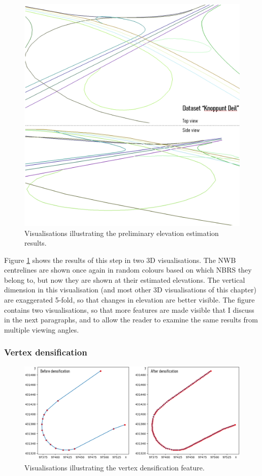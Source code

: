 \begin{figure}
    \centering
    \includegraphics[width=0.9\linewidth]{final_report/figs/elevationestimation0.png}
    \caption{Visualisations illustrating the preliminary elevation estimation results.}
    \label{fig:elevationestimation0}
\end{figure}

Figure \ref{fig:elevationestimation0} shows the results of this step in two 3D visualisations. The NWB centrelines are shown once again in random colours based on which NBRS they belong to, but now they are shown at their estimated elevations. The vertical dimension in this visualisation (and most other 3D visualisations of this chapter) are exaggerated 5-fold, so that changes in elevation are better visible. The figure contains two visualisations, so that more features are made visible that I discuss in the next paragraphs, and to allow the reader to examine the same results from multiple viewing angles.

\subsubsection{Vertex densification}

\begin{figure}
    \centering
    \includegraphics[width=0.9\linewidth]{final_report/figs/elevationestimation1.png}
    \caption{Visualisations illustrating the vertex densification feature.}
    \label{fig:elevationestimation1}
\end{figure}

